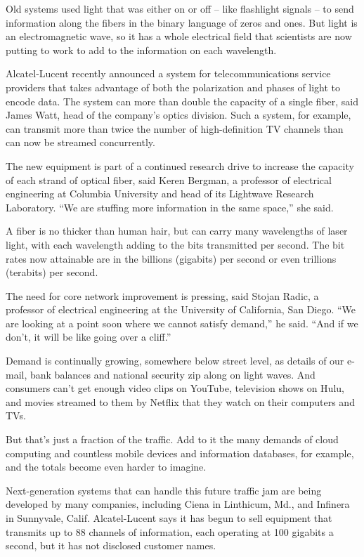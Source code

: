 ﻿\documentclass[12pt]{article}
\begin{document}
Old systems used light that was either on or off -- like flashlight signals -- to send information
along the fibers in the binary language of zeros and ones. But light is an electromagnetic wave, so
it has a whole electrical field that scientists are now putting to work to add to the information on
each wavelength.

Alcatel-Lucent recently announced a system for telecommunications service providers that takes
advantage of both the polarization and phases of light to encode data. The system can more than
double the capacity of a single fiber, said James Watt, head of the company's optics division. Such
a system, for example, can transmit more than twice the number of high-definition TV channels than
can now be streamed concurrently.

The new equipment is part of a continued research drive to increase the capacity of each strand of
optical fiber, said Keren Bergman, a professor of electrical engineering at Columbia University and
head of its Lightwave Research Laboratory. ``We are stuffing more information in the same space,''
she said.

A fiber is no thicker than human hair, but can carry many wavelengths of laser light, with each
wavelength adding to the bits transmitted per second. The bit rates now attainable are in the
billions (gigabits) per second or even trillions (terabits) per second.

The need for core network improvement is pressing, said Stojan Radic, a professor of electrical
engineering at the University of California, San Diego. ``We are looking at a point soon where we
cannot satisfy demand,'' he said. ``And if we don't, it will be like going over a cliff.''

Demand is continually growing, somewhere below street level, as details of our e-mail, bank balances
and national security zip along on light waves. And consumers can't get enough video clips on
YouTube, television shows on Hulu, and movies streamed to them by Netflix that they watch on their
computers and TVs.

But that's just a fraction of the traffic. Add to it the many demands of cloud computing and
countless mobile devices and information databases, for example, and the totals become even harder
to imagine.

Next-generation systems that can handle this future traffic jam are being developed by many
companies, including Ciena in Linthicum, Md., and Infinera in Sunnyvale, Calif. Alcatel-Lucent says
it has begun to sell equipment that transmits up to 88 channels of information, each operating at
100 gigabits a second, but it has not disclosed customer names.
\end{document}

